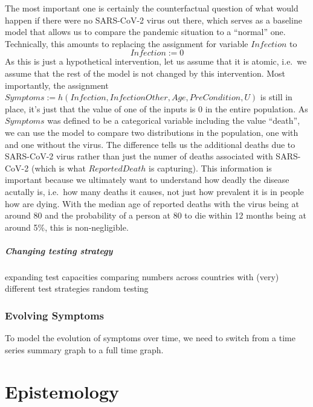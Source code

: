 \documentclass[
]{book}
\theoremstyle{definition}
\theoremstyle{definition}
\theoremstyle{definition}
\theoremstyle{remark}
\begin{document}
The most important one is certainly the counterfactual question of what would happen if there were no SARS-CoV-2 virus out there, which serves as a baseline model that allows us to compare the pandemic situation to a ``normal'' one.
Technically, this amounts to replacing the assignment for variable \(Infection\) to
\begin{equation}
Infection := 0
\end{equation}
As this is just a hypothetical intervention, let us assume that it is atomic, i.e.~we assume that the rest of the model is not changed by this intervention. Most importantly, the assignment \(Symptoms := h(Infection, InfectionOther, Age, PreCondition, U)\) is still in place, it's just that the value of one of the inputs is \(0\) in the entire population.
As \(Symptoms\) was defined to be a categorical variable including the value ``death'', we can use the model to compare two distributions in the population, one with and one without the virus. The difference tells us the additional deaths due to SARS-CoV-2 virus rather than just the numer of deaths associated with SARS-CoV-2 (which is what \(ReportedDeath\) is capturing). This information is important because we ultimately want to understand how deadly the disease acutally is, i.e.~how many deaths it causes, not just how prevalent it is in people how are dying. With the median age of reported deaths with the virus being at around 80 and the probability of a person at 80 to die within 12 months being at around 5\%, this is non-negligible.

\hypertarget{changing-testing-strategy}{%
\paragraph{Changing testing strategy}\label{changing-testing-strategy}}

expanding test capacities
comparing numbers across countries with (very) different test strategies
random testing

\hypertarget{evolving-symptoms}{%
\subsection{Evolving Symptoms}\label{evolving-symptoms}}

To model the evolution of symptoms over time, we need to switch from a time series summary graph to a full time graph.

\hypertarget{epistemology}{%
\chapter{Epistemology}\label{epistemology}}
\end{document}
